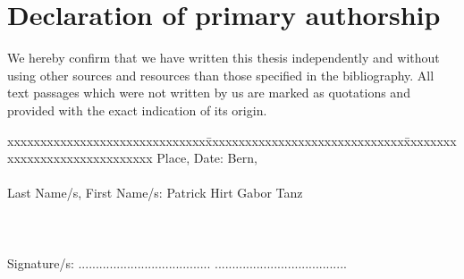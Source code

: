 \chapter*{Declaration of primary authorship}
\label{chap:declaration_authorship}

\vspace*{10mm} 

We hereby confirm that we have written this thesis independently and without using other sources and resources than those specified in the bibliography.
All text passages which were not written by us are marked as quotations and provided with the exact indication of its origin.

\vspace{15mm}

\begin{tabbing}
xxxxxxxxxxxxxxxxxxxxxxxxxxxxxx\=xxxxxxxxxxxxxxxxxxxxxxxxxxxxxx\=xxxxxxxxxxxxxxxxxxxxxxxxxxxxxx\kill
Place, Date:		\> Bern, \versiondate \\ \\
Last Name/s, First Name/s:	\> Patrick Hirt 	\> Gabor Tanz \\ \\ \\ \\
Signature/s:	\> ......................................\> ...................................... \\
\end{tabbing}
